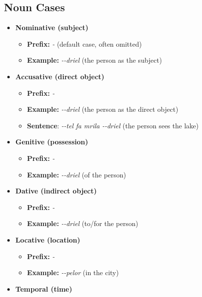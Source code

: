 \documentclass[letterpaper,twocolumn,openany,nodeprecatedcode,hidelinks]{dndbook}
\begin{document}
{\subsection*{Noun Cases}
\begin{itemize}
    \item \textbf{Nominative (subject)}
    \begin{itemize}
        \item \textbf{Prefix:} \textit{\CAnom-} (default case, often omitted)
        \item \textbf{Example:} \textit{\CAnom-\CLan-driel} (the person as the subject)
    \end{itemize}
    \item \textbf{Accusative (direct object)}
    \begin{itemize}
        \item \textbf{Prefix:} \textit{\CAacc-}
        \item \textbf{Example:} \textit{\CAacc-\CLan-driel} (the person as the direct object)
        \item \textbf{Sentence}: \textit{\CAacc-\CLin-tel fa mrila \CAnom-\CLan-driel} (the person sees the lake)
    \end{itemize}
    \item \textbf{Genitive (possession)}
    \begin{itemize}
        \item \textbf{Prefix:} \textit{\CAgen-}
        \item \textbf{Example:} \textit{\CAgen-\CLan-driel} (of the person)
    \end{itemize}
    \item \textbf{Dative (indirect object)}
    \begin{itemize}
        \item \textbf{Prefix:} \textit{\CAdat-}
        \item \textbf{Example:} \textit{\CAdat-\CLan-driel} (to/for the person)
    \end{itemize}
    \item \textbf{Locative (location)}
    \begin{itemize}
        \item \textbf{Prefix:} \textit{\CAloc-}
        \item \textbf{Example:} \textit{\CAloc-\CLin-pelor} (in the city)
    \end{itemize}
        \item \textbf{Temporal (time)}
    \begin{itemize}

\end{itemize}
\end{itemize}}
\end{document}

